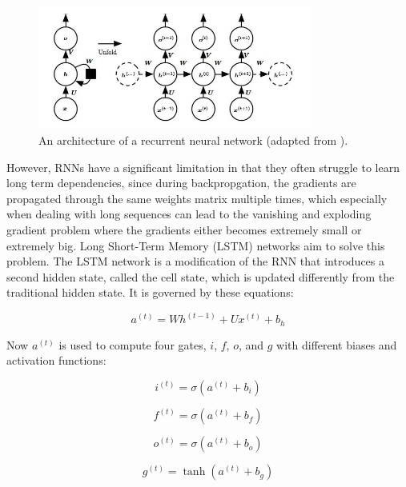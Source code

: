 \documentclass[11pt]{article}
\begin{document}
\begin{figure}[h]
\centering
\includegraphics[width=0.8\textwidth]{rnn_diagram.jpeg}
\caption{An architecture of a recurrent neural network (adapted from \cite{Goodfellow-et-al-2016}).}
\label{fig:rnn_diagram}
\end{figure}

However, RNNs have a significant limitation in that they often struggle to learn long term dependencies, since during backpropgation, the gradients are propagated through the same weights matrix multiple times, which especially when dealing with long sequences can lead to the vanishing and exploding gradient problem where the gradients either becomes extremely small or extremely big. Long Short-Term Memory (LSTM) networks  aim to solve this problem. The LSTM network is a modification of the RNN that introduces a second hidden state, called the cell state, which is updated differently from the traditional hidden state. It is governed by these equations:

\begin{equation} a^{(t)} = Wh^{(t-1)} + Ux^{(t)} + b_h\end{equation}

Now $a^{(t)}$ is used to compute four gates, $i$, $f$, $o$, and $g$ with different biases and activation functions:

\begin{equation} i^{(t)} = \sigma(a^{(t)} + b_i) \end{equation}

\begin{equation} f^{(t)} = \sigma(a^{(t)} + b_f) \end{equation}

\begin{equation} o^{(t)} = \sigma(a^{(t)} + b_o) \end{equation}

\begin{equation} g^{(t)} = \tanh(a^{(t)} + b_g) \end{equation}
\end{document}
